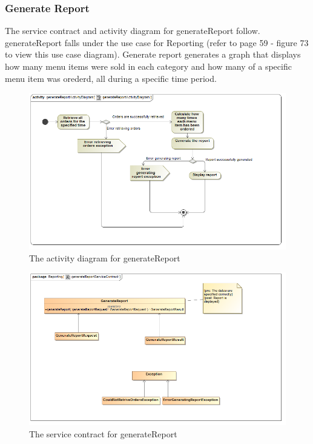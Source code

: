 \documentclass[a4paper,12pt]{report}
\begin{document}
\subsubsection{Generate Report}
The service contract and activity diagram for generateReport follow. generateReport falls under the use case for Reporting (refer to page 59 - figure 73 to view this use case diagram). Generate report generates a graph that displays how many menu items were sold in each category and how many of a specific menu item was orederd, all during a specific time period.
\begin{figure}[H]
 \centering
  \includegraphics[width=1.0\textwidth]{../images/generateReportActivityDiagram.png}
    \caption{The activity diagram for generateReport}
    \end{figure}
    
    \begin{figure}[H]
  \centering
    \includegraphics[width=1.0\textwidth]{../images/generateReportServiceContract.png}
    \caption{The service contract for generateReport} 
\end{figure}
\end{document}
